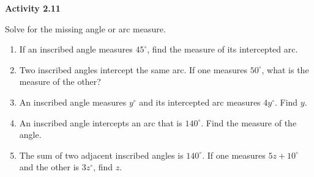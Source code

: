 \vspace{0.3ex}
\noindent\textbf{Activity 2.11}

\vspace{0.2ex}

Solve for the missing angle or arc measure.

\begin{enumerate}
    \item If an inscribed angle measures $45^\circ$, find the measure of its intercepted arc.
    \item Two inscribed angles intercept the same arc. If one measures $50^\circ$, what is the measure of the other?
    \item An inscribed angle measures $y^\circ$ and its intercepted arc measures $4y^\circ$. Find $y$.
    \item An inscribed angle intercepts an arc that is $140^\circ$. Find the measure of the angle.
    \item The sum of two adjacent inscribed angles is $140^\circ$. If one measures $5z + 10^\circ$ and the other is $3z^\circ$, find $z$.
\end{enumerate}

